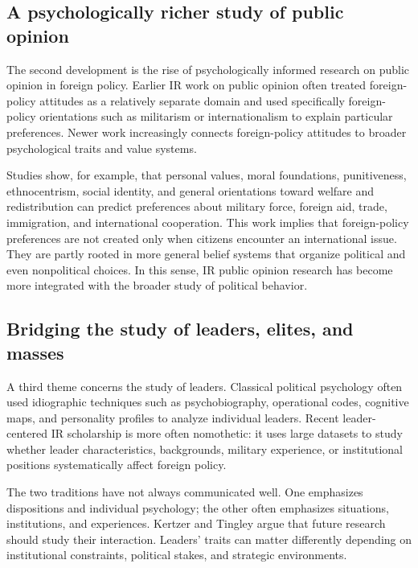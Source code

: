 \subsection{A psychologically richer study of public opinion}

The second development is the rise of psychologically informed research on public opinion in foreign policy. Earlier IR work on public opinion often treated foreign-policy attitudes as a relatively separate domain and used specifically foreign-policy orientations such as militarism or internationalism to explain particular preferences. Newer work increasingly connects foreign-policy attitudes to broader psychological traits and value systems.

Studies show, for example, that personal values, moral foundations, punitiveness, ethnocentrism, social identity, and general orientations toward welfare and redistribution can predict preferences about military force, foreign aid, trade, immigration, and international cooperation. This work implies that foreign-policy preferences are not created only when citizens encounter an international issue. They are partly rooted in more general belief systems that organize political and even nonpolitical choices. In this sense, IR public opinion research has become more integrated with the broader study of political behavior.

\subsection{Bridging the study of leaders, elites, and masses}

A third theme concerns the study of leaders. Classical political psychology often used idiographic techniques such as psychobiography, operational codes, cognitive maps, and personality profiles to analyze individual leaders. Recent leader-centered IR scholarship is more often nomothetic: it uses large datasets to study whether leader characteristics, backgrounds, military experience, or institutional positions systematically affect foreign policy.

The two traditions have not always communicated well. One emphasizes dispositions and individual psychology; the other often emphasizes situations, institutions, and experiences. Kertzer and Tingley argue that future research should study their interaction. Leaders' traits can matter differently depending on institutional constraints, political stakes, and strategic environments.

